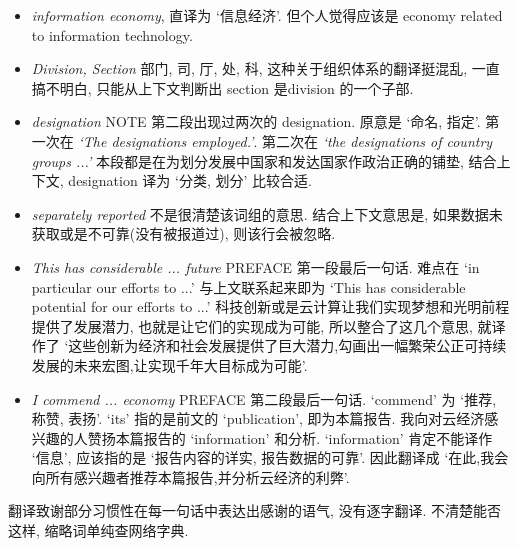 \documentclass[a4paper, UTF8, 12pt]{article}
\begin{document}
\begin{itemize}
    \item \emph{information economy}, 直译为 `信息经济'. 但个人觉得应该是 economy related to information technology. 
    \item \emph{Division, Section} 部门, 司, 厅, 处, 科, 这种关于组织体系的翻译挺混乱, 一直搞不明白, 只能从上下文判断出 section 是division 的一个子部.
    \item \emph{designation} NOTE 第二段出现过两次的 designation. 原意是 `命名, 指定'. 第一次在 \emph{`The designations employed.'}. 第二次在 \emph{`the designations of country groups ...'} 本段都是在为划分发展中国家和发达国家作政治正确的铺垫, 结合上下文, designation 译为 `分类, 划分' 比较合适.
    \item \emph{separately reported} 不是很清楚该词组的意思. 结合上下文意思是, 如果数据未获取或是不可靠(没有被报道过), 则该行会被忽略.
    \item \emph{This has considerable ... future} PREFACE 第一段最后一句话. 难点在 `in particular our efforts to ...' 与上文联系起来即为 `This has considerable potential for our efforts to ...' 科技创新或是云计算让我们实现梦想和光明前程提供了发展潜力, 也就是让它们的实现成为可能, 所以整合了这几个意思, 就译作了 `这些创新为经济和社会发展提供了巨大潜力,勾画出一幅繁荣公正可持续发展的未来宏图,让实现千年大目标成为可能'.
    \item \emph{I commend ... economy} PREFACE 第二段最后一句话. `commend' 为 `推荐, 称赞, 表扬'. `its' 指的是前文的 `publication', 即为本篇报告. 我向对云经济感兴趣的人赞扬本篇报告的 `information' 和分析. `information' 肯定不能译作 `信息', 应该指的是 `报告内容的详实, 报告数据的可靠'. 因此翻译成 `在此,我会向所有感兴趣者推荐本篇报告,并分析云经济的利弊'. 
\end{itemize}

翻译致谢部分习惯性在每一句话中表达出感谢的语气, 没有逐字翻译. 不清楚能否这样, 缩略词单纯查网络字典.
\end{document}
